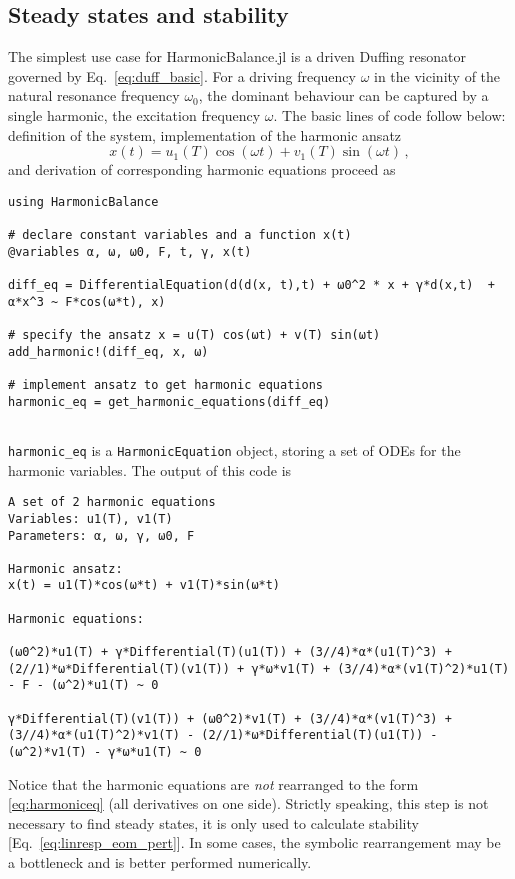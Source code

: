 \subsection{Steady states and stability} \label{sec:app_duffing_example}


The simplest use case for HarmonicBalance.jl is a driven Duffing resonator governed by Eq.~\eqref{eq:duff_basic}.
For a driving frequency $\omega$ in the vicinity of the natural resonance frequency $\omega_0$, the dominant behaviour can be captured by a single harmonic, the excitation frequency $\omega$. The basic lines of code follow below: definition of the system, implementation of the harmonic ansatz 
%
\begin{equation}
x(t) = u_1(T) \cos(\omega t ) + v_1(T) \sin(\omega t)\,,
\end{equation}
and derivation of corresponding harmonic equations proceed as
%
\begin{lstlisting}[numbers=none]
using HarmonicBalance

# declare constant variables and a function x(t)
@variables α, ω, ω0, F, t, γ, x(t) 

diff_eq = DifferentialEquation(d(d(x, t),t) + ω0^2 * x + γ*d(x,t)  + α*x^3 ~ F*cos(ω*t), x)

# specify the ansatz x = u(T) cos(ωt) + v(T) sin(ωt) 
add_harmonic!(diff_eq, x, ω) 

# implement ansatz to get harmonic equations 
harmonic_eq = get_harmonic_equations(diff_eq)


\end{lstlisting}
%
\texttt{harmonic\_eq} is a \texttt{HarmonicEquation} object, storing a set of ODEs for the harmonic variables. The output of this code is
%
\begin{lstlisting}[numbers=none, basicstyle=\scriptsize\ttfamily]
A set of 2 harmonic equations
Variables: u1(T), v1(T)
Parameters: α, ω, γ, ω0, F

Harmonic ansatz: 
x(t) = u1(T)*cos(ω*t) + v1(T)*sin(ω*t)

Harmonic equations:

(ω0^2)*u1(T) + γ*Differential(T)(u1(T)) + (3//4)*α*(u1(T)^3) + (2//1)*ω*Differential(T)(v1(T)) + γ*ω*v1(T) + (3//4)*α*(v1(T)^2)*u1(T) - F - (ω^2)*u1(T) ~ 0

γ*Differential(T)(v1(T)) + (ω0^2)*v1(T) + (3//4)*α*(v1(T)^3) + (3//4)*α*(u1(T)^2)*v1(T) - (2//1)*ω*Differential(T)(u1(T)) - (ω^2)*v1(T) - γ*ω*u1(T) ~ 0
\end{lstlisting}
%
Notice that the harmonic equations are \textit{not} rearranged to the form \eqref{eq:harmoniceq} (all derivatives on one side). Strictly speaking, this step is not necessary to find steady states, it is only used to calculate stability [Eq.~\eqref{eq:linresp_eom_pert}]. In some cases, the symbolic rearrangement may be a bottleneck and is better performed numerically.

